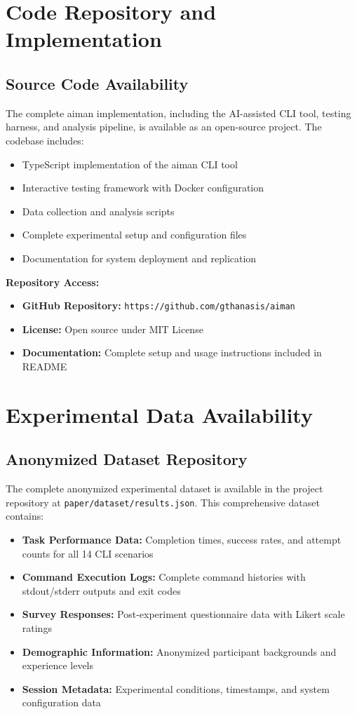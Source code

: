 \section{Code Repository and Implementation}

\subsection{Source Code Availability}
The complete aiman implementation, including the AI-assisted CLI tool, testing harness, and analysis pipeline, is available as an open-source project. The codebase includes:

\begin{itemize}
	\item TypeScript implementation of the aiman CLI tool
	\item Interactive testing framework with Docker configuration
	\item Data collection and analysis scripts
	\item Complete experimental setup and configuration files
	\item Documentation for system deployment and replication
\end{itemize}

\textbf{Repository Access:}
\begin{itemize}
	\item \textbf{GitHub Repository:} \texttt{https://github.com/gthanasis/aiman}
	\item \textbf{License:} Open source under MIT License
	\item \textbf{Documentation:} Complete setup and usage instructions included in README
\end{itemize}

\section{Experimental Data Availability}

\subsection{Anonymized Dataset Repository}
The complete anonymized experimental dataset is available in the project repository at \texttt{paper/dataset/results.json}. This comprehensive dataset contains:

\begin{itemize}
	\item \textbf{Task Performance Data:} Completion times, success rates, and attempt counts for all 14 CLI scenarios
	\item \textbf{Command Execution Logs:} Complete command histories with stdout/stderr outputs and exit codes
	\item \textbf{Survey Responses:} Post-experiment questionnaire data with Likert scale ratings
	\item \textbf{Demographic Information:} Anonymized participant backgrounds and experience levels
	\item \textbf{Session Metadata:} Experimental conditions, timestamps, and system configuration data
\end{itemize}


